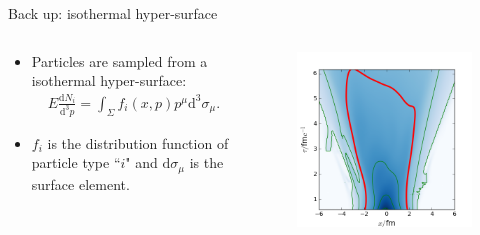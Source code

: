 \documentclass[11pt]{beamer}
\begin{document}
\begin{frame}[noframenumbering]{Back up: isothermal hyper-surface}
\begin{columns}[onlytextwidth]
  \begin{column}{0.6\textwidth}
  \begin{itemize}
	\item Particles are sampled from a isothermal hyper-surface:
	\begin{eqnarray}
	E\frac{\mathrm{d}N_i}{\mathrm{d}^3p} = \int_\Sigma f_i(x, p)p^\mu\mathrm{d}^3\sigma_\mu.
	\end{eqnarray}
	\item $f_i$ is the distribution function of particle type ``$i$" and $\mathrm{d}\sigma_\mu$ is the surface element.
  \end{itemize}
  \end{column}
  \begin{column}{0.4\textwidth}
    \begin{figure}
   	\begin{center}
   	\includegraphics[width=\textwidth]{pics/freeze.png}
	\end{center} 	
  	\end{figure}
  \end{column}
\end{columns}
\end{frame}
\end{document}
